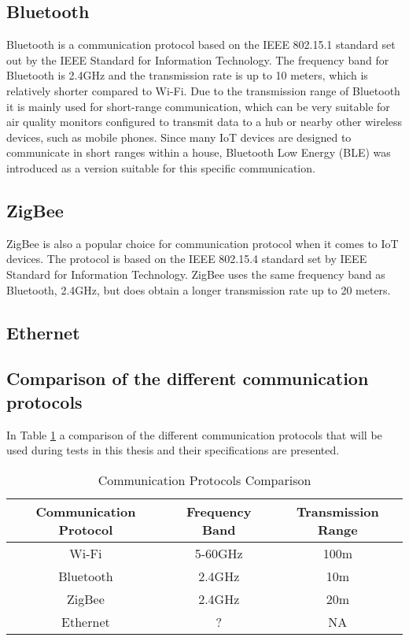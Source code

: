 \subsection*{Bluetooth}
Bluetooth is a communication protocol based on the IEEE 802.15.1 standard set out by the IEEE Standard for Information Technology. The frequency band for Bluetooth is 2.4GHz and the transmission rate is up to 10 meters, which is relatively shorter compared to Wi-Fi. \cite{IAQMonitorCommunicationReview} Due to the transmission range of Bluetooth it is mainly used for short-range communication, which can be very suitable for air quality monitors configured to transmit data to a hub or nearby other wireless devices, such as mobile phones. Since many IoT devices are designed to communicate in short ranges within a house, Bluetooth Low Energy (BLE) was introduced as a version suitable for this specific communication. \cite{SecurityofCommunicationProt} 

\subsection*{ZigBee}
ZigBee is also a popular choice for communication protocol when it comes to IoT devices. The protocol is based on the IEEE 802.15.4 standard set by IEEE Standard for Information Technology. \cite{ZigBeeStandard} ZigBee uses the same frequency band as Bluetooth, 2.4GHz, but does obtain a longer transmission rate up to 20 meters. \cite{IAQMonitorCommunicationReview} 

\subsection*{Ethernet}

\subsection*{Comparison of the different communication protocols}
In Table \ref{CommunicationProtocolsComparison} a comparison of the different communication protocols that will be used during tests in this thesis and their specifications are presented. \\
\begin{table}[!hbtp]
\begin{tabular}{||c | c | c ||} 
 \hline
 Communication Protocol & Frequency Band & Transmission Range  \\ [0.5ex]
 \hline\hline
 Wi-Fi & 5-60GHz & 100m \\ 
 Bluetooth & 2.4GHz & 10m \\
 ZigBee & 2.4GHz & 20m \\
 Ethernet & ? & NA \\ [1ex] 
 \hline
\end{tabular}
\caption{Communication Protocols Comparison}
\label{CommunicationProtocolsComparison}
\end{table}